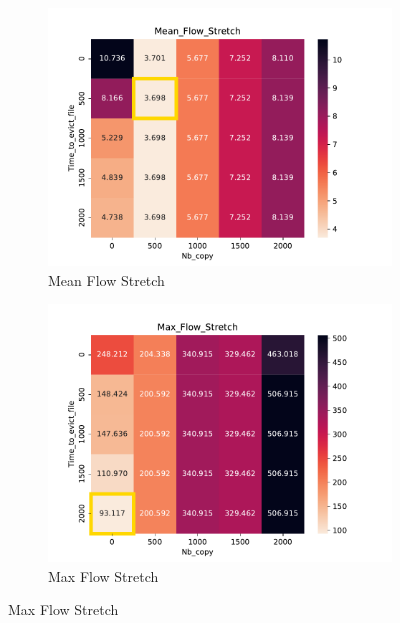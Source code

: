 \documentclass[a4paper]{article}
\begin{document}
\begin{figure}[H]\centering
\begin{subfigure}[b]{0.4\linewidth}\centering\includegraphics[width=1\linewidth]{MBSS/plot/Heatmap_Stretch_FCFS_Score_Time_to_evict_file_Nb_copy_2022-01-24->2022-01-24_450_128_32_256_4_1024.pdf}\caption{Mean Flow Stretch}\end{subfigure}
\begin{subfigure}[b]{0.4\linewidth}\centering\includegraphics[width=1\linewidth]{MBSS/plot/Heatmap_Max_Stretch_FCFS_Score_Time_to_evict_file_Nb_copy_2022-01-24->2022-01-24_450_128_32_256_4_1024.pdf}\caption{Max Flow Stretch}\end{subfigure}

\end{figure}
\end{document}
